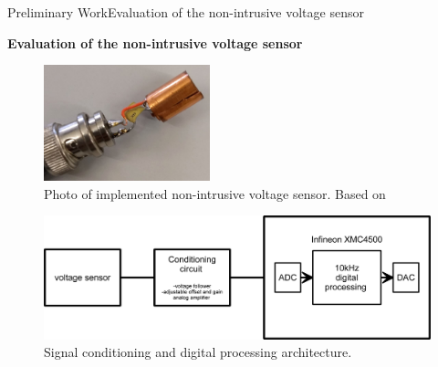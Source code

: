 \begin{frame}{Preliminary Work}{Evaluation of the non-intrusive voltage sensor}
\begin{block}{\textbf{Evaluation of the non-intrusive voltage sensor}}
	
		\begin{minipage}[t]{0.51\linewidth}
		
		\begin{figure}[ht!]
			\centering
				\includegraphics[width=0.43\textwidth,keepaspectratio]{figures/50.PreliminaryW/voltage_sensor}
			\caption{Photo of implemented non-intrusive voltage sensor. Based on \cite{brunelli2016}}
		\end{figure}
	\end{minipage}\hfill
	\begin{minipage}[t]{0.48\linewidth}
		
		
		\begin{figure}[ht!]
			\centering
			\includegraphics[width=1\textwidth,keepaspectratio]{figures/50.PreliminaryW/generalArchitecture}
			\caption{Signal conditioning and digital processing architecture.}
		\end{figure}
		
		
		
	\end{minipage}
	
	
	
\end{block}
\end{frame}

